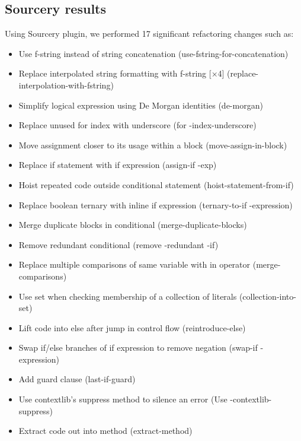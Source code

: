 \documentclass[unicode,11pt,a4paper,oneside,numbers=endperiod,openany]{scrartcl}
\begin{document}
\subsection{Sourcery results}
Using Sourcery plugin, we performed 17 significant refactoring changes such as:
\begin{itemize}
    \item Use f-string instead of string concatenation (use-fstring-for-concatenation)
    \item Replace interpolated string formatting with f-string [×4] (replace-interpolation-with-fstring)
    \item Simplify logical expression using De Morgan identities (de-morgan)
    \item Replace unused for index with underscore (for -index-underscore)
    \item Move assignment closer to its usage within a block (move-assign-in-block)
    \item Replace if statement with if expression (assign-if -exp)
    \item Hoist repeated code outside conditional statement (hoist-statement-from-if)
    \item Replace boolean ternary with inline if expression (ternary-to-if -expression)
    \item Merge duplicate blocks in conditional (merge-duplicate-blocks)
    \item Remove redundant conditional (remove -redundant -if)
    \item Replace multiple comparisons of same variable with in operator (merge-comparisons)
    \item Use set when checking membership of a collection of literals (collection-into-set)
    \item Lift code into else after jump in control flow (reintroduce-else)
    \item Swap if/else branches of if expression to remove negation (swap-if -expression)
    \item Add guard clause (last-if-guard)
    \item Use contextlib's suppress method to silence an error (Use -contextlib-suppress)
    \item Extract code out into method (extract-method)
\end{itemize}
\end{document}

